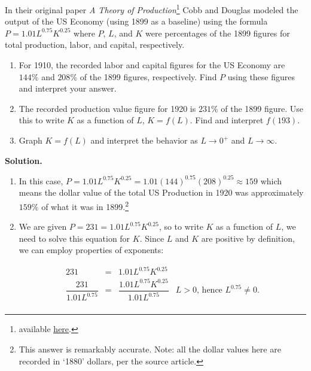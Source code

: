 \begin{ex} \label{CobbDouglasEx}  In their original paper \textit{A Theory of Production}\footnote{available \href{http://bit.ly/2dxlstt}{\underline{here}}.} Cobb and Douglas modeled the output of the US Economy (using 1899 as a baseline) using the formula $P = 1.01 L^{0.75} K^{0.25}$ where $P$, $L$, and $K$ were percentages of the 1899 figures for total production, labor, and capital, respectively.

\begin{enumerate}

\item  For 1910, the recorded labor and capital figures for the US Economy are $144 \%$ and $208 \%$ of the 1899 figures, respectively.  Find $P$ using these figures and interpret your answer.

\item  The recorded production value figure for 1920 is $231 \%$ of the 1899 figure.  Use this to write $K$ as a function of $L$, $K = f(L)$.  Find and interpret $f(193)$.

\item  Graph $K = f(L)$ and interpret the behavior as $L \rightarrow 0^{+}$ and $L \rightarrow \infty$.


\end{enumerate}

{\bf Solution.}

\begin{enumerate}

\item  In this case, $P = 1.01 L^{0.75} K^{0.25} = 1.01 (144)^{0.75} (208)^{0.25} \approx 159$ which means the dollar value of the total US Production in 1920 was approximately $159 \%$ of what it was in 1899.\footnote{This answer is remarkably accurate. Note:  all the dollar values here are recorded in `1880' dollars, per the source article. }  


\item We are given $P = 231 = 1.01L^{0.75} K^{0.25}$, so to write $K$ as a function of $L$, we need to solve this equation for $K$.  Since $L$ and $K$ are positive by definition, we can employ properties of exponents:

\[ \begin{array}{rclr}

231 & = & 1.01 L^{0.75} K^{0.25} & \\

\dfrac{231}{1.01 L^{0.75}} & = &  \dfrac{1.01 L^{0.75} K^{0.25}}{1.01 L^{0.75}} & \text{$L>0$, hence $L^{0.75} \neq 0$.}\\


\end{array}\]
\end{enumerate}
\end{ex}
